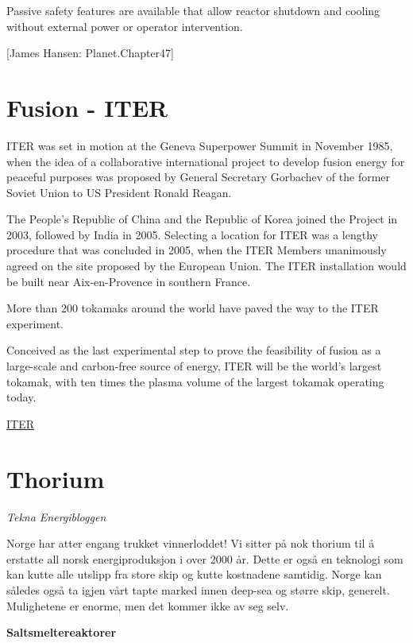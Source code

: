 \documentclass[
]{book}
\begin{document}
Passive safety features are available that allow reactor shutdown and cooling without external
power or operator intervention.

{[}James Hansen: Planet.Chapter47{]}

\hypertarget{fusion---iter}{%
\section{Fusion - ITER}\label{fusion---iter}}

ITER was set in motion at the Geneva Superpower Summit in November 1985, when the idea of a collaborative international project to develop fusion energy for peaceful purposes was proposed by General Secretary Gorbachev of the former Soviet Union to US President Ronald Reagan.

The People's Republic of China and the Republic of Korea joined the Project in 2003, followed by India in 2005. Selecting a location for ITER was a lengthy procedure that was concluded in 2005, when the ITER Members unanimously agreed on the site proposed by the European Union. The ITER installation would be built near Aix-en-Provence in southern France.

More than 200 tokamaks around the world have paved the way to the ITER experiment.

Conceived as the last experimental step to prove the feasibility of fusion as a large-scale and carbon-free source of energy, ITER will be the world's largest tokamak, with ten times the plasma volume of the largest tokamak operating today.

\href{https://www.iter.org/proj/iterhistory}{ITER}

\hypertarget{thorium}{%
\section{Thorium}\label{thorium}}

\emph{Tekna Energibloggen}

Norge har atter engang trukket vinnerloddet! Vi sitter på nok thorium til å erstatte all norsk energiproduksjon i over 2000 år. Dette er også en teknologi som kan kutte alle utslipp fra store skip og kutte kostnadene samtidig. Norge kan således også ta igjen vårt tapte marked innen deep-sea og større skip, generelt. Mulighetene er enorme, men det kommer ikke av seg selv.

\textbf{Saltsmeltereaktorer}
\end{document}
